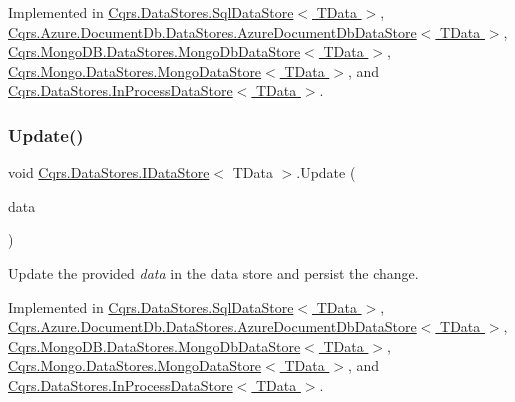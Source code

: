 Implemented in \hyperlink{classCqrs_1_1DataStores_1_1SqlDataStore_abb88337dccf3d5372f6b0920d5d26ebd}{Cqrs.\+Data\+Stores.\+Sql\+Data\+Store$<$ T\+Data $>$}, \hyperlink{classCqrs_1_1Azure_1_1DocumentDb_1_1DataStores_1_1AzureDocumentDbDataStore_a0d72cc318e98e01b3dbed86d412a8778}{Cqrs.\+Azure.\+Document\+Db.\+Data\+Stores.\+Azure\+Document\+Db\+Data\+Store$<$ T\+Data $>$}, \hyperlink{classCqrs_1_1MongoDB_1_1DataStores_1_1MongoDbDataStore_ac0cb8626e8f8ab0275a31e88a920ee3e}{Cqrs.\+Mongo\+D\+B.\+Data\+Stores.\+Mongo\+Db\+Data\+Store$<$ T\+Data $>$}, \hyperlink{classCqrs_1_1Mongo_1_1DataStores_1_1MongoDataStore_a878966ea796321cae54c3c619e3178d5}{Cqrs.\+Mongo.\+Data\+Stores.\+Mongo\+Data\+Store$<$ T\+Data $>$}, and \hyperlink{classCqrs_1_1DataStores_1_1InProcessDataStore_acd350f7abef7311064434ae31a50755b}{Cqrs.\+Data\+Stores.\+In\+Process\+Data\+Store$<$ T\+Data $>$}.

\mbox{\label{interfaceCqrs_1_1DataStores_1_1IDataStore_a6d5d4dd572de8db01ff0c48d37faefa7}} 
\subsubsection{\texorpdfstring{Update()}{Update()}}
{\footnotesize\ttfamily void \hyperlink{interfaceCqrs_1_1DataStores_1_1IDataStore}{Cqrs.\+Data\+Stores.\+I\+Data\+Store}$<$ T\+Data $>$.Update (\begin{DoxyParamCaption}\item[{T\+Data}]{data }\end{DoxyParamCaption})}



Update the provided {\itshape data}  in the data store and persist the change. 



Implemented in \hyperlink{classCqrs_1_1DataStores_1_1SqlDataStore_a8f85191cecef92d003620d4064584bb2}{Cqrs.\+Data\+Stores.\+Sql\+Data\+Store$<$ T\+Data $>$}, \hyperlink{classCqrs_1_1Azure_1_1DocumentDb_1_1DataStores_1_1AzureDocumentDbDataStore_a55f504ed5094e3041a266b958424b1a2}{Cqrs.\+Azure.\+Document\+Db.\+Data\+Stores.\+Azure\+Document\+Db\+Data\+Store$<$ T\+Data $>$}, \hyperlink{classCqrs_1_1MongoDB_1_1DataStores_1_1MongoDbDataStore_af86a3df56e2df92fb9ef880ff4fa5f16}{Cqrs.\+Mongo\+D\+B.\+Data\+Stores.\+Mongo\+Db\+Data\+Store$<$ T\+Data $>$}, \hyperlink{classCqrs_1_1Mongo_1_1DataStores_1_1MongoDataStore_a03aac0495445d34f124db893cd09cbd8}{Cqrs.\+Mongo.\+Data\+Stores.\+Mongo\+Data\+Store$<$ T\+Data $>$}, and \hyperlink{classCqrs_1_1DataStores_1_1InProcessDataStore_af70e6f6e5aabc24ee12ef3d2bcd3bf60}{Cqrs.\+Data\+Stores.\+In\+Process\+Data\+Store$<$ T\+Data $>$}.

